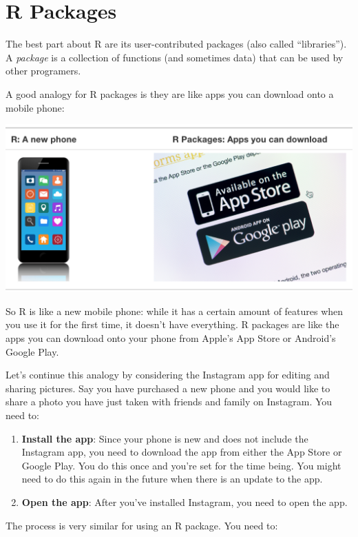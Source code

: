 \documentclass[]{book}
\providecommand{\tightlist}{%
  \setlength{\itemsep}{0pt}\setlength{\parskip}{0pt}}
\begin{document}
\hypertarget{r-packages-1}{\section{R Packages}\label{r-packages-1}}

The best part about R are its user-contributed packages (also called
``libraries''). A \emph{package} is a collection of functions (and
sometimes data) that can be used by other programers.

A good analogy for R packages is they are like apps you can download
onto a mobile phone:

\begin{center}\includegraphics[width=0.7\linewidth]{img/R_vs_R_packages} \end{center}

So R is like a new mobile phone: while it has a certain amount of
features when you use it for the first time, it doesn't have everything.
R packages are like the apps you can download onto your phone from
Apple's App Store or Android's Google Play.

Let's continue this analogy by considering the Instagram app for editing
and sharing pictures. Say you have purchased a new phone and you would
like to share a photo you have just taken with friends and family on
Instagram. You need to:

\begin{enumerate}
\def\labelenumi{\arabic{enumi}.}
\tightlist
\item
  \textbf{Install the app}: Since your phone is new and does not include
  the Instagram app, you need to download the app from either the App
  Store or Google Play. You do this once and you're set for the time
  being. You might need to do this again in the future when there is an
  update to the app.
\item
  \textbf{Open the app}: After you've installed Instagram, you need to
  open the app.
\end{enumerate}

The process is very similar for using an R package. You need to:
\end{document}
